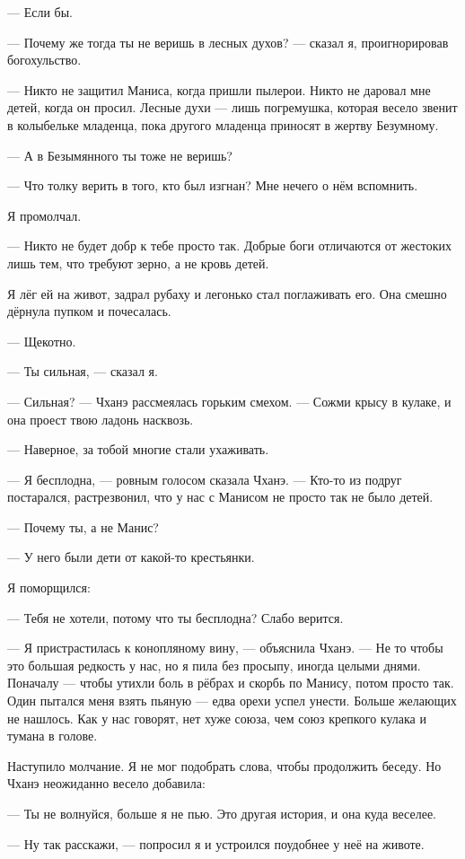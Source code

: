 --- Если бы.

--- Почему же тогда ты не веришь в лесных духов? --- сказал я, проигнорировав богохульство.

--- Никто не защитил Маниса, когда пришли пылерои.
Никто не даровал мне детей, когда он просил.
Лесные духи --- лишь погремушка, которая весело звенит в колыбельке младенца, пока другого младенца приносят в жертву Безумному.

--- А в Безымянного ты тоже не веришь?

--- Что толку верить в того, кто был изгнан?
Мне нечего о нём вспомнить.

Я промолчал.

--- Никто не будет добр к тебе просто так.
Добрые боги отличаются от жестоких лишь тем, что требуют зерно, а не кровь детей.

Я лёг ей на живот, задрал рубаху и легонько стал поглаживать его.
Она смешно дёрнула пупком и почесалась.

--- Щекотно.

--- Ты сильная, --- сказал я.

--- Сильная? --- Чханэ рассмеялась горьким смехом.
--- Сожми крысу в кулаке, и она проест твою ладонь насквозь.

--- Наверное, за тобой многие стали ухаживать.

--- Я бесплодна, --- ровным голосом сказала Чханэ.
--- Кто-то из подруг постарался, растрезвонил, что у нас с Манисом не просто так не было детей.

--- Почему ты, а не Манис?

--- У него были дети от какой-то крестьянки.

Я поморщился:

--- Тебя не хотели, потому что ты бесплодна?
Слабо верится.

--- Я пристрастилась к конопляному вину, --- объяснила Чханэ.
--- Не то чтобы это большая редкость у нас, но я пила без просыпу, иногда целыми днями.
Поначалу --- чтобы утихли боль в рёбрах и скорбь по Манису, потом просто так.
Один пытался меня взять пьяную --- едва орехи успел унести.
Больше желающих не нашлось.
Как у нас говорят, нет хуже союза, чем союз крепкого кулака и тумана в голове.

Наступило молчание. Я не мог подобрать слова, чтобы продолжить беседу.
Но Чханэ неожиданно весело добавила:

--- Ты не волнуйся, больше я не пью.
Это другая история, и она куда веселее.

--- Ну так расскажи, --- попросил я и устроился поудобнее у неё на животе.

